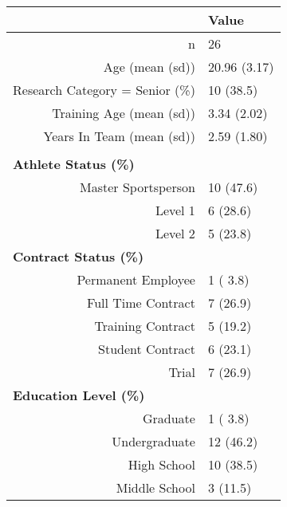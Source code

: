 
\begin{table}[]
\centering
\begin{tabular}{@{}rl@{}}
\toprule
\multicolumn{1}{l}{}            Variable                 & Value        \\ \midrule
n                                                & 26           \\
Age (mean (sd))                                  & 20.96 (3.17) \\
Research Category = Senior (\%)                   & 10 (38.5)    \\
Training Age (mean (sd))                          & 3.34 (2.02)  \\
Years In Team (mean (sd))                          & 2.59 (1.80)  \\
\multicolumn{1}{l}{}                             &              \\
\multicolumn{1}{l}{\textbf{Athlete Status (\%)}}  &              \\
Master Sportsperson                              & 10 (47.6)    \\
Level 1                                          & 6 (28.6)     \\
Level 2                                          & 5 (23.8)     \\
\multicolumn{1}{l}{\textbf{Contract Status (\%)}} &              \\
Permanent Employee                               & 1 ( 3.8)     \\
Full Time Contract                               & 7 (26.9)     \\
Training Contract                                & 5 (19.2)     \\
Student Contract                                 & 6 (23.1)     \\
Trial                                            & 7 (26.9)     \\
\multicolumn{1}{l}{\textbf{Education Level (\%)}} &              \\
Graduate                                         & 1 ( 3.8)     \\
Undergraduate                                    & 12 (46.2)    \\
High School                                      & 10 (38.5)    \\
Middle School                                    & 3 (11.5)     \\

\end{tabular}
\end{table}
